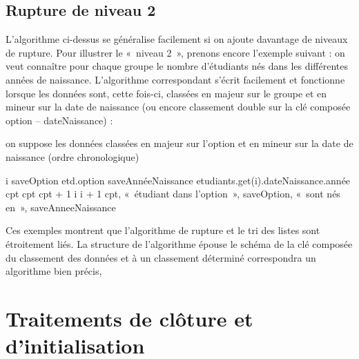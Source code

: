 \subsection*{Rupture de niveau 2}

	L’algorithme ci-dessus se généralise facilement si on ajoute davantage de niveaux de rupture. 
	Pour illustrer le «~niveau 2~», prenons encore l’exemple suivant : 
	on veut connaître pour chaque groupe le nombre d’étudiants nés dans les différentes années de naissance. 
	L’algorithme correspondant s’écrit facilement et fonctionne lorsque les données sont, cette fois-ci,
	classées en majeur sur le groupe et en mineur sur la date de naissance
	(ou encore classement double sur la clé composée option – dateNaissance) :
	
	\begin{LDA}
		\label{algo:rupt2}
			\LComment on suppose les données classées en majeur sur l’option
			\LComment et en mineur sur la date de naissance (ordre chronologique)
	
			\Let i 
				\Let saveOption \Gets etd.option
					\Let saveAnnéeNaissance \Gets etudiants.get(i).dateNaissance.année
					\Let cpt 
						\Let cpt \Gets cpt + 1
						\Let i \Gets i + 1		
					\EndWhile
					\Write cpt, «~étudiant dans l’option~», saveOption, 
					«~sont nés en~», saveAnneeNaissance
				\EndWhile
			\EndWhile
		\EndAlgo
	\end{LDA}

	Ces exemples montrent que l’algorithme de rupture 
	et le tri des listes sont étroitement liés. 
	La structure de l’algorithme épouse le schéma de la clé composée du classement des données
	et à un classement déterminé correspondra un algorithme bien précis, 

\section{Traitements de clôture et d’initialisation}

